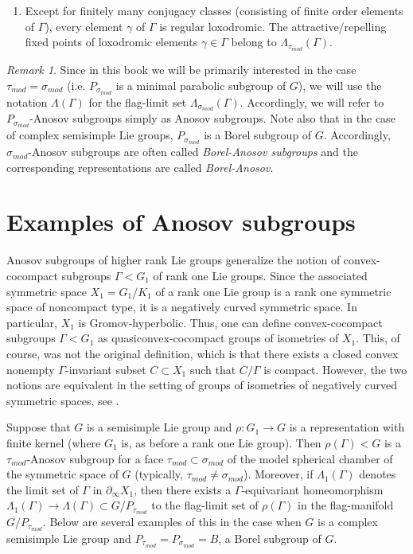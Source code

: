 \documentclass[12pt]{amsbook}%
\theoremstyle{definition}
\theoremstyle{remark}
\newtheorem{rem}[thm]{Remark}
\numberwithin{section}{chapter}
\numberwithin{subsection}{section}
\numberwithin{figure}{chapter}
\def\taumod{\tau_{mod}}
\def\simod{\sigma_{mod}}
\def\Ga{\Gamma}
\def\ga{\gamma}
\def\La{\Lambda}
\def\geo{\partial_\infty}
\def\kap{}
\begin{document}
{{\begin{enumerate}
\item Except for finitely many conjugacy classes (consisting of finite order elements of $\Ga$), every element $\ga$ of $\Ga$ is regular loxodromic. 
The attractive/repelling fixed points of loxodromic elements $\ga\in \Ga$ belong to $\La_{\taumod}(\Ga)$. 
\end{enumerate}

\begin{rem}
Since in this book we will be primarily interested in the case $\taumod=\simod$ (i.e. $P_{\simod}$ is a minimal parabolic subgroup of $G$), 
we will use the notation $\La(\Ga)$ for the flag-limit set $\La_{\simod}(\Ga)$. Accordingly, we will refer to $P_{\simod}$-Anosov subgroups 
simply as Anosov subgroups. Note also that in the case of complex semisimple Lie groups, $P_{\simod}$ is a Borel subgroup of $G$. 
Accordingly, $\simod$-Anosov subgroups are often called {\em Borel-Anosov subgroups} and the corresponding representations are called {\em Borel-Anosov}. 
\end{rem}





\section{Examples of Anosov subgroups}

Anosov subgroups of higher rank Lie groups generalize the notion of convex-cocompact subgroups $\Ga< G_1$ of rank one Lie groups. Since the associated symmetric space $X_1=G_1/K_1$ of a rank one Lie group is a rank one symmetric space of noncompact type, it is a negatively curved symmetric space. In particular, $X_1$ is Gromov-hyperbolic. Thus, one can define convex-cocompact subgroups $\Ga< G_1$ as quasiconvex-cocompact groups of isometries of $X_1$. This, of course, was not the original definition, which is that there exists a closed convex nonempty $\Ga$-invariant subset $C\subset X_1$ such that $C/\Ga$ is compact. However, the two notions are equivalent in the setting of groups of isometries of negatively curved symmetric spaces, see \cite{Bowditch1995}. 


Suppose that $G$ is a semisimple Lie group and $\rho: G_1\to G$ is a representation with finite kernel (where $G_1$ is, as before a rank one Lie group). Then 
$\rho(\Ga)< G$ is a ${\taumod}$-Anosov subgroup for a face $\taumod\subset \simod$ of the model spherical chamber of the symmetric space of $G$ (typically, $\taumod\ne \simod$). Moreover, if $\La_1(\Ga)$ denotes the  limit set of $\Ga$ in $\geo X_1$, then there exists a $\Ga$-equivariant homeomorphism $\La_1(\Ga)\to \La(\Ga)\subset G/P_{\taumod}$ to the flag-limit set 
of $\rho(\Ga)$ in the flag-manifold $G/P_{\taumod}$. Below are several examples of this in the case when $G$ is a complex semisimple Lie group and $P_{\taumod}=P_{\simod}=B$, a Borel subgroup of $G$. 

}}
\end{document}
